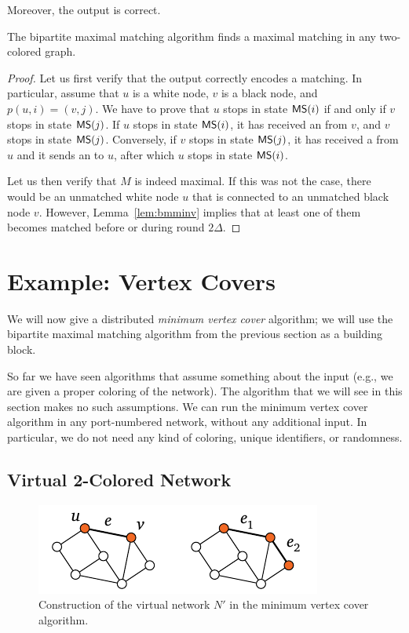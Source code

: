 Moreover, the output is correct.
\begin{lemma}\label{lem:bmm-correct}
    The bipartite maximal matching algorithm finds a maximal matching in any two-colored graph.
\end{lemma}
\begin{proof}
    Let us first verify that the output correctly encodes a matching. In particular, assume that $u$ is a white node, $v$ is a black node, and $p(u,i) = (v,j)$. We have to prove that $u$ stops in state $\textup{\sffamily MS}(i)$ if and only if $v$ stops in state $\textup{\sffamily MS}(j)$. If $u$ stops in state $\textup{\sffamily MS}(i)$, it has received an  from $v$, and $v$ stops in state $\textup{\sffamily MS}(j)$. Conversely, if $v$ stops in state $\textup{\sffamily MS}(j)$, it has received a  from $u$ and it sends an  to $u$, after which $u$ stops in state $\textup{\sffamily MS}(i)$.
    
    Let us then verify that $M$ is indeed maximal. If this was not the case, there would be an unmatched white node $u$ that is connected to an unmatched black node $v$. However, Lemma~\ref{lem:bmminv} implies that at least one of them becomes matched before or during round $2\Delta$.
\end{proof}


\section{Example: Vertex Covers}\label{sec:vc3}

We will now give a distributed \emph{minimum vertex cover } algorithm; we will use the bipartite maximal matching algorithm from the previous section as a building block.

So far we have seen algorithms that assume something about the input (e.g., we are given a proper coloring of the network). The algorithm that we will see in this section makes no such assumptions. We can run the minimum vertex cover  algorithm in any port-numbered network, without any additional input. In particular, we do not need any kind of coloring, unique identifiers, or randomness.


\subsection{Virtual 2-Colored Network}

\begin{figure}
    \centering
    \includegraphics[page=\PVCThreeApx]{figs.pdf}
    \caption{Construction of the virtual network $N'$ in the minimum vertex cover  algorithm.}\label{fig:vc3}
\end{figure}

